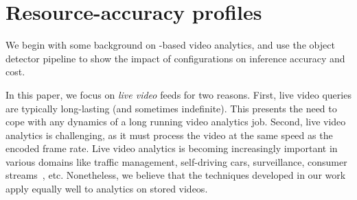 \section{Resource-accuracy profiles}
We begin with some background on \nn-based video analytics, and use the object detector pipeline to show the impact of configurations on inference accuracy and cost.


In this paper, we focus on {\em live video} feeds for two reasons.
First, live video queries are typically long-lasting (and sometimes
indefinite). %
This presents the need to cope with any dynamics of 
a long running video analytics job.
Second, live video analytics is challenging, as it
must process the video at the same speed as the encoded frame rate. %
Live video analytics is becoming increasingly important in various domains like traffic management, self-driving cars, surveillance, consumer streams~\cite{twitch}, etc. Nonetheless, we believe that the techniques developed in our work apply equally well to analytics on stored videos. 

